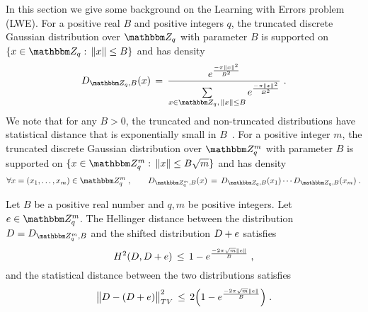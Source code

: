 
In this section we give some background on the Learning with Errors problem (LWE). 
For a positive real $B$ and positive integers $q$, the truncated discrete Gaussian distribution over $\mZ_q$ with parameter $B$ is supported on $\{x\in\mZ_q:\,\|x\|\leq B\}$ and has density
\begin{equation}\label{eq:d-bounded-def}
 D_{\mZ_q,B}(x) \,=\, \frac{e^{\frac{-\pi\lVert x\rVert^2}{B^2}}}{\sum\limits_{x\in\mZ_q,\, \|x\|\leq B}e^{\frac{-\pi\lVert x\rVert^2}{B^2}}} \;.
\end{equation}
We note that for any $B>0$, the truncated and non-truncated distributions have statistical distance that is exponentially small in $B$~\cite[Lemma 1.5]{banaszczyk1993new}. For a positive integer $m$, the truncated discrete Gaussian distribution over $\mZ_q^m$ with parameter $B$ is supported on $\{x\in\mZ_q^m:\,\|x\|\leq B\sqrt{m}\}$ and has density
\begin{equation}\label{eq:d-bounded-def-m}
\forall x = (x_1,\ldots,x_m) \in \mZ_q^m\;,\qquad D_{\mZ_q^m,B}(x) \,=\, D_{\mZ_q,B}(x_1)\cdots D_{\mZ_q,B}(x_m)\;.
\end{equation}

\begin{lemma}\label{lem:distributiondistance}
Let $B$ be a positive real number and $q,m$ be positive integers. Let $\*e \in \mZ_q^m$. The Hellinger distance between the distribution $D = D_{\mZ_q^{m},B}$ and the shifted distribution $D+\*e$ satisfies
\begin{equation}
H^2(D,D+\*e) \,\leq\, 1- e^{\frac{-2\pi \sqrt{m}\|\*e\|}{B}}\;,
\end{equation}
and the statistical distance between the two distributions satisfies
\begin{equation}
\big\| D - (D+\*e) \big\|_{TV}^2 \,\leq\, 2\Big(1 - e^{\frac{-2\pi \sqrt{m}\|\*e\|}{B}}\Big)\;.
\end{equation}
\end{lemma}

